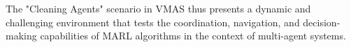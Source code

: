 \documentclass{scrartcl}
\begin{document}
The "Cleaning Agents" scenario in VMAS thus presents a dynamic and challenging environment that tests the coordination, navigation, and decision-making capabilities of MARL algorithms in the context of multi-agent systems.


%
%
\printbibliography %
\end{document}
